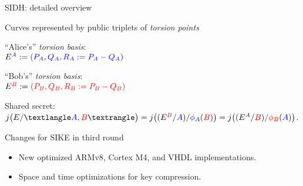 \documentclass[aspectratio=169]{beamer}
\newcommand{\cyc}[1]{{〈 #1 〉}}
\newcommand{\bl}[1]{\textcolor{blue}{#1}}
\newcommand{\rd}[1]{\textcolor{red}{#1}}
\begin{document}

\begin{frame}{SIDH: detailed overview}
  \begin{center}
    Curves represented by public triplets of \textit{torsion points}
  \end{center}
  \begin{minipage}{0.45\linewidth}
      ``Alice's'' \textit{torsion basis}:\\
      $E^{\bl{A}} := \bl{(P_A, Q_A, R_A:=P_A-Q_A)}$
  \end{minipage}
  \hfill
  \begin{minipage}{0.45\linewidth}
    \begin{flushright}
      ``Bob's'' \textit{torsion basis}:\\
      $E^{\rd{B}} := \rd{(P_B, Q_B, R_B:=P_B-Q_B)}$
    \end{flushright}
  \end{minipage}

  \begin{center}

    \bigskip
    Shared secret:\\
    $j\bigl(E/\cyc{\bl{A},\rd{B}}\bigr) =
    j\bigl((E^{\rd{B}}/\bl{A})/\bl{\phi_A}(\rd{B})\bigr) =
    j\bigl((E^{\bl{A}}/\rd{B})/\rd{\phi_B}(\bl{A})\bigr)$.
  \end{center}
\end{frame}


\begin{frame}{Changes for SIKE in third round}
  \begin{itemize}
  \item New optimized ARMv8, Cortex M4, and VHDL implementations.
  \item Space and time optimizations for key compression.
  \end{itemize}
\end{frame}
\end{document}
